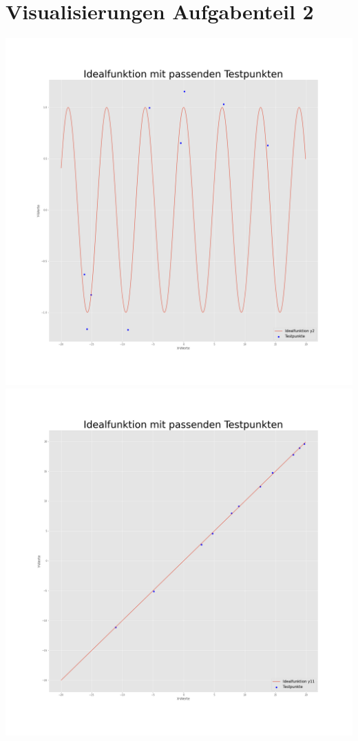 \documentclass[
    a4paper, 								%
    oneside, 								%
    11pt, 									%
    listof=totoc, 					%
    bibliography=totoc, 		%
    final, 									%
    numbers=noenddot
]{scrreprt}
\begin{document}
\section{Visualisierungen Aufgabenteil 2}
\includegraphics[width=1\textwidth]{Idealfuntionfunktion_y2_Testpunkte}
\newpage
\includegraphics[width=1\textwidth]{Idealfuntionfunktion_y11_Testpunkte}
\end{document}
